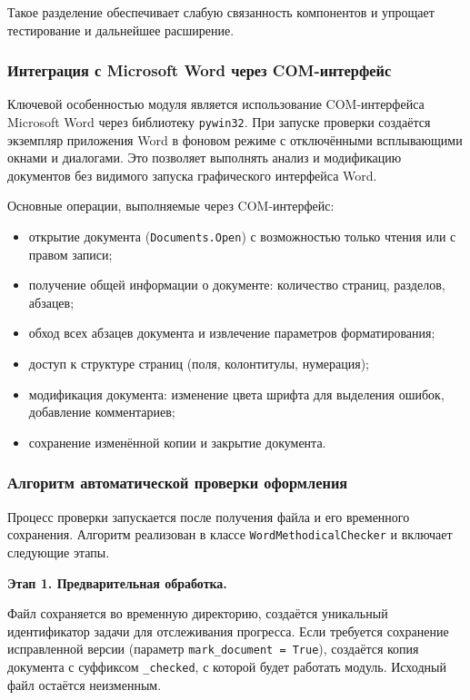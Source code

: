 Такое разделение обеспечивает слабую связанность компонентов и упрощает тестирование и дальнейшее расширение.

\subsubsection{Интеграция с Microsoft Word через COM-интерфейс}

Ключевой особенностью модуля является использование COM-интерфейса Microsoft Word через библиотеку \texttt{pywin32}. При запуске проверки создаётся экземпляр приложения Word в фоновом режиме с отключёнными всплывающими окнами и диалогами. Это позволяет выполнять анализ и модификацию документов без видимого запуска графического интерфейса Word.

Основные операции, выполняемые через COM-интерфейс:

\begin{itemize}
	\item открытие документа (\texttt{Documents.Open}) с возможностью только чтения или с правом записи;
	\item получение общей информации о документе: количество страниц, разделов, абзацев;
	\item обход всех абзацев документа и извлечение параметров форматирования;
	\item доступ к структуре страниц (поля, колонтитулы, нумерация);
	\item модификация документа: изменение цвета шрифта для выделения ошибок, добавление комментариев;
	\item сохранение изменённой копии и закрытие документа.
\end{itemize}

\subsubsection{Алгоритм автоматической проверки оформления}

Процесс проверки запускается после получения файла и его временного сохранения. Алгоритм реализован в классе \texttt{WordMethodicalChecker} и включает следующие этапы.

\textbf{Этап 1. Предварительная обработка.}

Файл сохраняется во временную директорию, создаётся уникальный идентификатор задачи для отслеживания прогресса. Если требуется сохранение исправленной версии (параметр \texttt{mark\_document = True}), создаётся копия документа с суффиксом \texttt{\_checked}, с которой будет работать модуль. Исходный файл остаётся неизменным.

